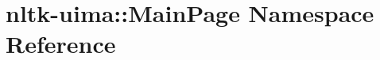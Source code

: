 \hypertarget{namespacenltk-uima_1_1MainPage}{\section{nltk-\/uima\-:\-:\-Main\-Page \-Namespace \-Reference}
\label{namespacenltk-uima_1_1MainPage}
}
